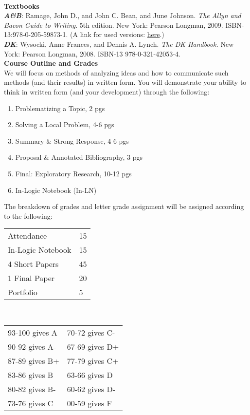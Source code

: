 \documentclass [11pt]{article}
\begin{document}
   \ \\

   {\bf Textbooks}\\
{\bf \textsl{A\&B}}: Ramage, John D., and John C. Bean, and June Johnson. {\sl The Allyn and Bacon Guide to Writing}. 5th edition. New York: Pearson Longman, 2009. ISBN-13:978-0-205-59873-1. (A link for used versions:  \href{http://www.amazon.com/Allyn-Bacon-Guide-Writing-MyCompLab/dp/0205598730/ref=sr_1_3/175-1452668-8158623?ie=UTF8&s=books&qid=1245772101&sr=1-3}{here}.) 
\\
{\bf \textsl {DK}}: Wysocki, Anne Frances, and Dennis A. Lynch. {\sl The DK Handbook.} New York: Pearson Longman, 2008. ISBN-13 978-0-321-42053-4. 
   \ \\

   
   {\bf Course Outline and Grades}\\
   We will focus on methods of analyzing ideas and how to communicate such methods (and their results) in written form. You will demonstrate your ability to think in written form (and your development) through the following:
   \begin{enumerate}
     \item Problematizing a Topic, 2 pgs
     \item Solving a Local Problem, 4-6 pgs
     \item Summary \& Strong Response, 4-6 pgs
     \item Proposal \& Annotated Bibliography, 3 pgs
     \item Final: Exploratory Research, 10-12 pgs
     \item In-Logic Notebook (In-LN)
   \end{enumerate}

The breakdown of grades and letter grade assignment will be assigned according to the following:
\vskip 2mm
  
\begin{tabular}{|l|l|}
\hline
Attendance & 15\\
In-Logic Notebook & 15\\
4 Short Papers & 45\\
1 Final Paper & 20\\
Portfolio & 5\\
\hline
\end{tabular} \  \  \  \  \ \begin{tabular}{|l|l|}
   \hline
   93-100 gives A & 70-72 gives C-\\
   90-92 gives A- & 67-69 gives D+\\
   87-89 gives B+ & 77-79 gives C+\\
   83-86 gives B & 63-66 gives D\\
   80-82 gives B- & 60-62 gives D-\\
   73-76 gives C & 00-59 gives F\\
   \hline 
   \end{tabular}
   \ \\
\end{document}
